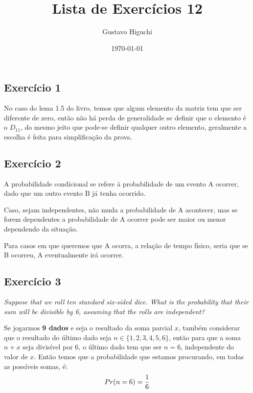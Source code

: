 \documentclass{article}
\title{Lista de Exercícios 12}
\author{Gustavo Higuchi}
\date{\today}
\begin{document}
\maketitle

\tableofcontents
\newpage


\chapter{}
\section{Exercício 1}
\hspace*{30pt}No caso do lema 1.5 do livro, temos que algum elemento
da matriz tem que ser diferente de zero, então não há perda de generalidade 
se definir que o elemento é o $D_{11}$, do mesmo jeito que pode-se definir 
qualquer outro elemento, geralmente a escolha é feita para simplificação 
da prova.

\section{Exercício 2}
\hspace*{30pt}A probabilidade condicional se refere à probabilidade
de um evento A ocorrer, dado que um outro evento B já tenha ocorrido.

Caso, sejam independentes, não muda a probabilidade de A acontecer, mas
se forem dependentes a probabilidade de A ocorrer pode ser maior ou menor
dependendo da situação.

Para casos em que queremos que A ocorra, a relação de tempo físico,
seria que se B ocorreu, A eventualmente irá ocorrer. 

\section{Exercício 3}
\textit{Suppose that we roll ten standard six-sided dice. What is the probability 
that their sum will be divisible by 6, assuming that the rolls are independent? }

\hspace*{30pt} Se jogarmos \textbf{9 dados} e seja o resultado da soma parcial $x$,
também considerar que o resultado do último dado seja $n \in \{1,2,3,4,5,6\}$, então
para que a soma $n + x$ seja divisível por 6, o último dado tem que ser $n = 6$,
independente do valor de $x$. Então temos que a probabilidade que estamos procurando,
em todas as possíveis somas, é:
\begin{equation}
\notag
    Pr(n=6) = \dfrac{1}{6}
\end{equation}
\end{document}
